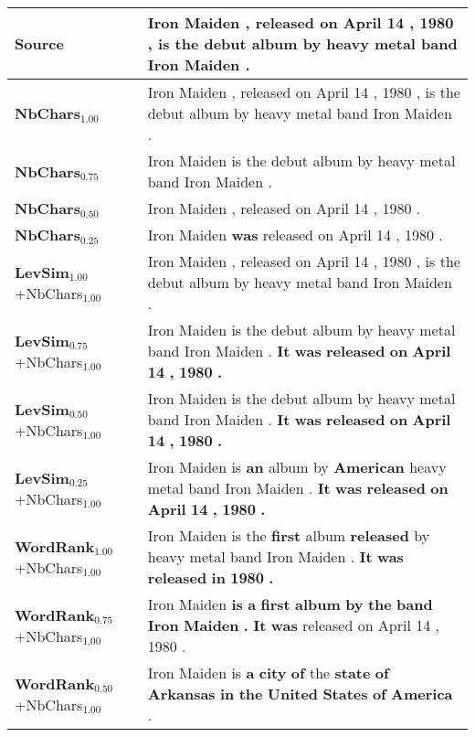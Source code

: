 \documentclass[10pt, a4paper]{article}
\begin{document}
\begin{table*}
{\begin{tabular}{ll}
\textbf{Source} & Iron Maiden , released on April 14 , 1980 , is the debut album by heavy metal band Iron Maiden . \\
\midrule
\textbf{NbChars$_{1.00}$} & Iron Maiden , released on April 14 , 1980 , is the debut album by heavy metal band Iron Maiden . \\
\textbf{NbChars$_{0.75}$} & Iron Maiden is the debut album by heavy metal band Iron Maiden . \\
\textbf{NbChars$_{0.50}$} & Iron Maiden , released on April 14 , 1980 . \\
\textbf{NbChars$_{0.25}$} & Iron Maiden \textbf{was} released on April 14 , 1980 . \\
\midrule
\textbf{LevSim$_{1.00}$}\footnotesize{+NbChars$_{1.00}$} & Iron Maiden , released on April 14 , 1980 , is the debut album by heavy metal band Iron Maiden . \\
\textbf{LevSim$_{0.75}$}\footnotesize{+NbChars$_{1.00}$} & Iron Maiden is the debut album by heavy metal band Iron Maiden . \textbf{It} \textbf{was} \textbf{released} \textbf{on} \textbf{April} \textbf{14} \textbf{,} \textbf{1980} \textbf{.} \\
\textbf{LevSim$_{0.50}$}\footnotesize{+NbChars$_{1.00}$} & Iron Maiden is the debut album by heavy metal band Iron Maiden . \textbf{It} \textbf{was} \textbf{released} \textbf{on} \textbf{April} \textbf{14} \textbf{,} \textbf{1980} \textbf{.} \\
\textbf{LevSim$_{0.25}$}\footnotesize{+NbChars$_{1.00}$} & Iron Maiden is \textbf{an} album by \textbf{American} heavy metal band Iron Maiden . \textbf{It} \textbf{was} \textbf{released} \textbf{on} \textbf{April} \textbf{14} \textbf{,} \textbf{1980} \textbf{.} \\
\midrule
\textbf{WordRank$_{1.00}$}\footnotesize{+NbChars$_{1.00}$} & Iron Maiden is the \textbf{first} album \textbf{released} by heavy metal band Iron Maiden . \textbf{It} \textbf{was} \textbf{released} \textbf{in} \textbf{1980} \textbf{.} \\
\textbf{WordRank$_{0.75}$}\footnotesize{+NbChars$_{1.00}$} & Iron Maiden \textbf{is} \textbf{a} \textbf{first} \textbf{album} \textbf{by} \textbf{the} \textbf{band} \textbf{Iron} \textbf{Maiden} \textbf{.} \textbf{It} \textbf{was} released on April 14 , 1980 . \\
\textbf{WordRank$_{0.50}$}\footnotesize{+NbChars$_{1.00}$} & Iron Maiden is \textbf{a} \textbf{city} \textbf{of} the \textbf{state} \textbf{of} \textbf{Arkansas} \textbf{in} \textbf{the} \textbf{United} \textbf{States} \textbf{of} \textbf{America} . \\

\end{tabular}}
\end{table*}
\end{document}

